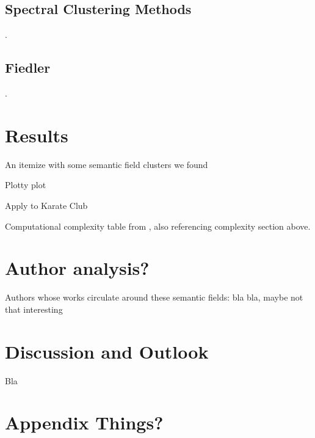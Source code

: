 \documentclass[12pt, a4paper]{article}
\begin{document}
  \subsection{Spectral Clustering Methods}
  \cite{fortunato}.

  \subsection{Fiedler}
  \cite{fortunato}.

  \section{Results}
  An itemize with some semantic field clusters we found

  Plotty plot

  Apply to Karate Club

  Computational complexity table from \cite{watset}, also referencing complexity section above.

  \section{Author analysis?}
  Authors whose works circulate around these semantic fields:
  bla bla, maybe not that interesting

  \pagebreak
  \section{Discussion and Outlook}
  Bla

  \pagebreak
  \printbibliography

  \appendix
  \section{Appendix Things?}
\end{document}
